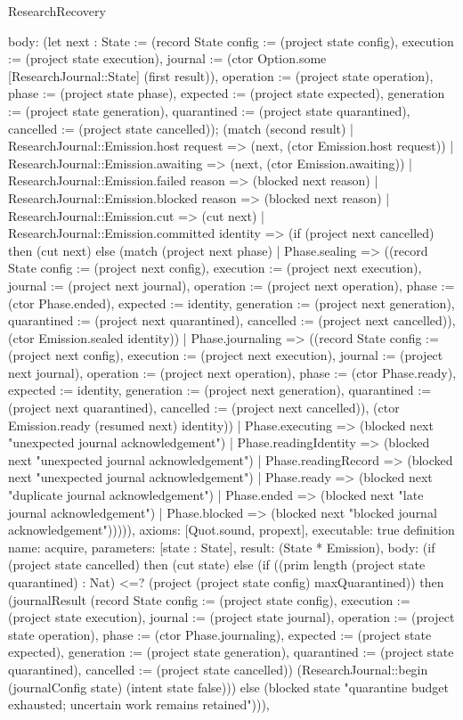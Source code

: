 \begin{lexlean}{ResearchRecovery}
\begin{semanticmodule}
{ body: (let next : State := (record State {config := (project state config), execution := (project state execution), journal := (ctor Option.some [ResearchJournal::State] (first result)), operation := (project state operation), phase := (project state phase), expected := (project state expected), generation := (project state generation), quarantined := (project state quarantined), cancelled := (project state cancelled)}); (match (second result) | ResearchJournal::Emission.host request => (next, (ctor Emission.host request)) | ResearchJournal::Emission.awaiting => (next, (ctor Emission.awaiting)) | ResearchJournal::Emission.failed reason => (blocked next reason) | ResearchJournal::Emission.blocked reason => (blocked next reason) | ResearchJournal::Emission.cut => (cut next) | ResearchJournal::Emission.committed identity => (if (project next cancelled) then (cut next) else (match (project next phase) | Phase.sealing => ((record State {config := (project next config), execution := (project next execution), journal := (project next journal), operation := (project next operation), phase := (ctor Phase.ended), expected := identity, generation := (project next generation), quarantined := (project next quarantined), cancelled := (project next cancelled)}), (ctor Emission.sealed identity)) | Phase.journaling => ((record State {config := (project next config), execution := (project next execution), journal := (project next journal), operation := (project next operation), phase := (ctor Phase.ready), expected := identity, generation := (project next generation), quarantined := (project next quarantined), cancelled := (project next cancelled)}), (ctor Emission.ready (resumed next) identity)) | Phase.executing => (blocked next "unexpected journal acknowledgement") | Phase.readingIdentity => (blocked next "unexpected journal acknowledgement") | Phase.readingRecord => (blocked next "unexpected journal acknowledgement") | Phase.ready => (blocked next "duplicate journal acknowledgement") | Phase.ended => (blocked next "late journal acknowledgement") | Phase.blocked => (blocked next "blocked journal acknowledgement"))))),
 axioms: [Quot.sound, propext],
 executable: true
}
definition{
 name: acquire,
 parameters: [state : State],
 result: (State * Emission),
 body: (if (project state cancelled) then (cut state) else (if ((prim length (project state quarantined) : Nat) <=? (project (project state config) maxQuarantined)) then (journalResult (record State {config := (project state config), execution := (project state execution), journal := (project state journal), operation := (project state operation), phase := (ctor Phase.journaling), expected := (project state expected), generation := (project state generation), quarantined := (project state quarantined), cancelled := (project state cancelled)}) (ResearchJournal::begin (journalConfig state) (intent state false))) else (blocked state "quarantine budget exhausted; uncertain work remains retained"))),
}
\end{semanticmodule}
\end{lexlean}
